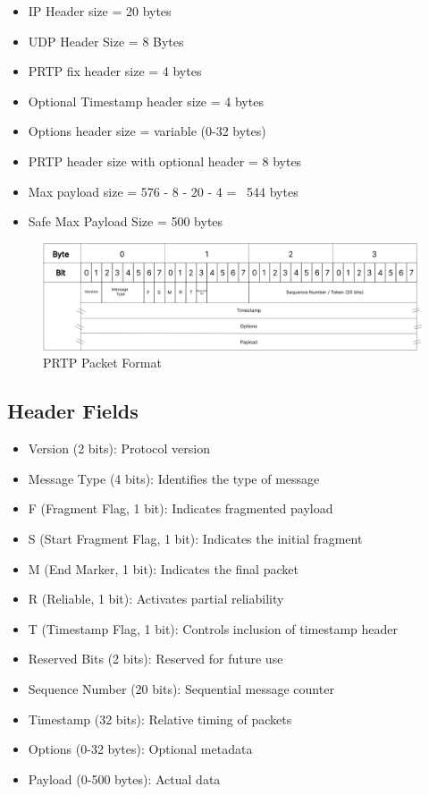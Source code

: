 \documentclass[lettersize,journal]{IEEEtran}
\begin{document}
\begin{itemize}
    \item IP Header size = 20 bytes
    \item UDP Header Size = 8 Bytes
    \item PRTP fix header size = 4 bytes
    \item Optional Timestamp header size = 4 bytes
    \item Options header size = variable (0-32 bytes)
    \item PRTP header size with optional header = 8 bytes
    \item Max payload size = 576 - 8 - 20 - 4 = ~544 bytes
    \item Safe Max Payload Size = 500 bytes
\end{itemize}

\begin{figure}[htbp]
    \centering
    \includegraphics[width=0.8\columnwidth]{Figure/packet_format.png}
    \caption{PRTP Packet Format}
    \label{fig:packet_format}
\end{figure}

\subsection{Header Fields}
\begin{itemize}
    \item Version (2 bits): Protocol version
    \item Message Type (4 bits): Identifies the type of message
    \item F (Fragment Flag, 1 bit): Indicates fragmented payload
    \item S (Start Fragment Flag, 1 bit): Indicates the initial fragment
    \item M (End Marker, 1 bit): Indicates the final packet
    \item R (Reliable, 1 bit): Activates partial reliability
    \item T (Timestamp Flag, 1 bit): Controls inclusion of timestamp header
    \item Reserved Bits (2 bits): Reserved for future use
    \item Sequence Number (20 bits): Sequential message counter
    \item Timestamp (32 bits): Relative timing of packets
    \item Options (0-32 bytes): Optional metadata
    \item Payload (0-500 bytes): Actual data
\end{itemize}
\end{document}

